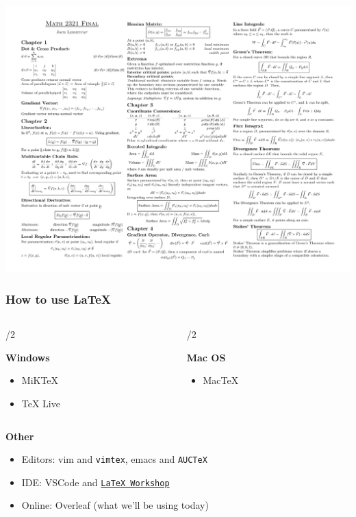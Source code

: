 \documentclass{beamer} \usetheme{Madrid}
\begin{document}
\begin{frame}
    \vfill
    \centering\includegraphics[height=\textheight]{CheatSheet.png}
    \vfill
\end{frame}

\begin{frame}
    \vfill
    \frametitle{How to use {\LaTeX}}
    \begin{columns}[t]
        \begin{column}{\textwidth/2}
            \begin{center}
                \textbf{Windows}
            \end{center}
            \begin{itemize}
                \item MiKTeX
                \item TeX Live
            \end{itemize}
        \end{column}
        \begin{column}{\textwidth/2}
            \begin{center}
                \textbf{Mac OS}
            \end{center}
            \begin{itemize}
                \item MacTeX
            \end{itemize}
        \end{column}
    \end{columns}
    \vfill
    \textbf{Other}
    \begin{itemize}
        \item Editors: vim and \texttt{vimtex}, emacs and \texttt{AUCTeX}
        \item IDE: VSCode and \href{https://marketplace.visualstudio.com/items?itemName=James-Yu.latex-workshop}{\texttt{LaTeX Workshop}}
        \item Online: Overleaf (what we'll be using today)
    \end{itemize}
    \vfill
\end{frame}
\end{document}
